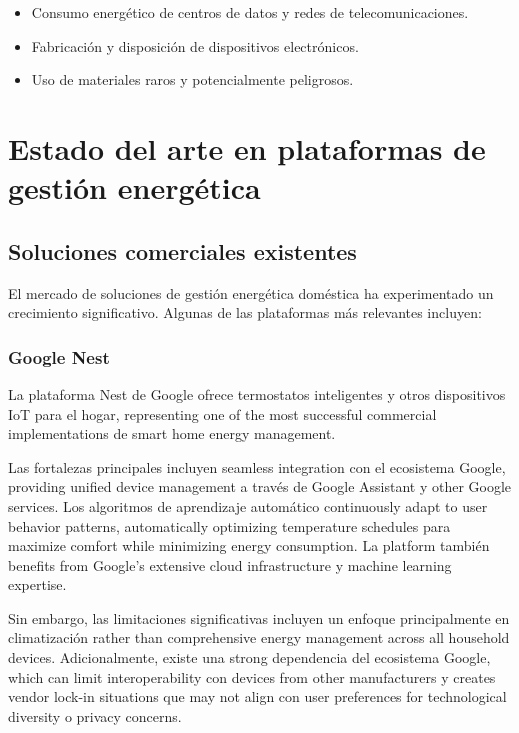\begin{itemize}
    \item Consumo energético de centros de datos y redes de telecomunicaciones.
    \item Fabricación y disposición de dispositivos electrónicos.
    \item Uso de materiales raros y potencialmente peligrosos.
\end{itemize}

\section{Estado del arte en plataformas de gestión energética}

\subsection{Soluciones comerciales existentes}

El mercado de soluciones de gestión energética doméstica ha experimentado un crecimiento significativo. Algunas de las plataformas más relevantes incluyen:

\subsubsection{Google Nest}

La plataforma Nest de Google ofrece termostatos inteligentes y otros dispositivos IoT para el hogar, representing one of the most successful commercial implementations de smart home energy management.

Las fortalezas principales incluyen seamless integration con el ecosistema Google, providing unified device management a través de Google Assistant y other Google services. Los algoritmos de aprendizaje automático continuously adapt to user behavior patterns, automatically optimizing temperature schedules para maximize comfort while minimizing energy consumption. La platform también benefits from Google's extensive cloud infrastructure y machine learning expertise.

Sin embargo, las limitaciones significativas incluyen un enfoque principalmente en climatización rather than comprehensive energy management across all household devices. Adicionalmente, existe una strong dependencia del ecosistema Google, which can limit interoperability con devices from other manufacturers y creates vendor lock-in situations que may not align con user preferences for technological diversity o privacy concerns.

